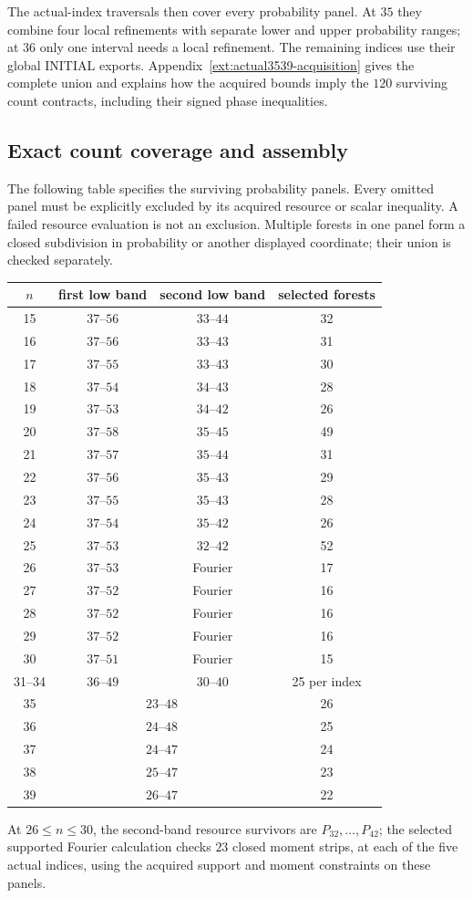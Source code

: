 The actual-index traversals then cover every probability panel.
At $35$ they combine four local refinements with separate lower and
upper probability ranges; at $36$ only one interval needs a local
refinement. The remaining indices use their global INITIAL exports.
Appendix~\ref{ext:actual3539-acquisition} gives the complete union and
explains how the acquired bounds imply the $120$ surviving count
contracts, including their signed phase inequalities.

\subsection{Exact count coverage and assembly}
The following table specifies the surviving probability panels.
Every omitted panel must be explicitly excluded by its acquired
resource or scalar inequality. A failed resource evaluation is not
an exclusion. Multiple forests in one panel form a closed subdivision
in probability or another displayed coordinate; their union is
checked separately.
\begin{center}\small
\begin{tabular}{c|c|c|c}
$n$ & first low band & second low band & selected forests\\\hline
15 & $37$--$56$ & $33$--$44$ &32\\
16 & $37$--$56$ & $33$--$43$ &31\\
17 & $37$--$55$ & $33$--$43$ &30\\
18 & $37$--$54$ & $34$--$43$ &28\\
19 & $37$--$53$ & $34$--$42$ &26\\
20 & $37$--$58$ & $35$--$45$ &49\\
21 & $37$--$57$ & $35$--$44$ &31\\
22 & $37$--$56$ & $35$--$43$ &29\\
23 & $37$--$55$ & $35$--$43$ &28\\
24 & $37$--$54$ & $35$--$42$ &26\\
25 & $37$--$53$ & $32$--$42$ &52\\
26 & $37$--$53$ & Fourier &17\\
27 & $37$--$52$ & Fourier &16\\
28 & $37$--$52$ & Fourier &16\\
29 & $37$--$52$ & Fourier &16\\
30 & $37$--$51$ & Fourier &15\\
31--34 & $36$--$49$ & $30$--$40$ &25 per index\\
35 & \multicolumn{2}{c|}{$23$--$48$} &26\\
36 & \multicolumn{2}{c|}{$24$--$48$} &25\\
37 & \multicolumn{2}{c|}{$24$--$47$} &24\\
38 & \multicolumn{2}{c|}{$25$--$47$} &23\\
39 & \multicolumn{2}{c|}{$26$--$47$} &22
\end{tabular}
\end{center}
At $26\le n\le30$, the second-band resource survivors are
$P_{32},\ldots,P_{42}$; the selected supported Fourier calculation
checks $23$ closed moment strips, at each of the five actual indices,
using the acquired support and moment constraints on these panels.

